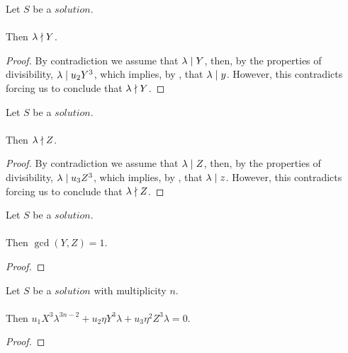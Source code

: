 \begin{lemma}
    \label{lmm:lambda_not_dvd_Y}
    \leanok
    Let $S$ be a $solution$.\\\\
    Then $\lambda \nmid Y$.
\end{lemma}
\begin{proof}
    \leanok
    By contradiction we assume that $\lambda \mid Y$, then, by the properties of divisibility,
    $\lambda \mid u_2 Y^3$, which implies, by ,
    that $\lambda \mid y$.
    However, this contradicts 
    forcing us to conclude that $\lambda \nmid Y$.
\end{proof}

\begin{lemma}
    \label{lmm:lambda_not_dvd_Z}
    \leanok
    Let $S$ be a $solution$.\\\\
    Then $\lambda \nmid Z$.
\end{lemma}
\begin{proof}
    \leanok
    By contradiction we assume that $\lambda \mid Z$, then, by the properties of divisibility,
    $\lambda \mid u_3 Z^3$, which implies, by ,
    that $\lambda \mid z$.
    However, this contradicts 
    forcing us to conclude that $\lambda \nmid Z$.
\end{proof}

\begin{lemma}
    \label{lmm:coprime_Y_Z}
    \leanok
    Let $S$ be a $solution$.\\\\
    Then $\gcd(Y, Z) = 1$.
\end{lemma}
\begin{proof}
    \leanok
\end{proof}

\begin{lemma}
    \label{lmm:formula1}
    \leanok
    Let $S$ be a $solution$ with multiplicity $n$.\\\\
    Then $u_1 X^3 \lambda^{3n-2}+u_2 \eta Y^3 \lambda +
    u_3 \eta^2 Z^3 \lambda = 0$.
\end{lemma}
\begin{proof}
    \leanok
\end{proof}

